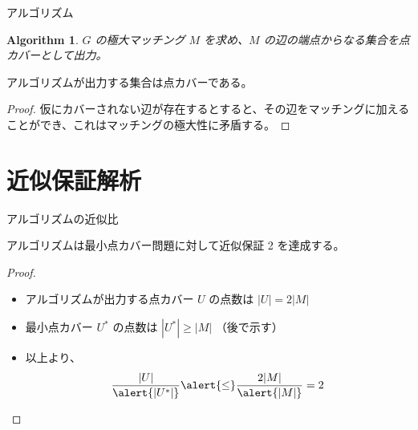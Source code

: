 \documentclass[aspectratio=169]{beamer}
\newtheorem*{algorithm}{Algorithm}
\begin{document}
\begin{frame}{アルゴリズム}
	\begin{algorithm}
		\(G\) の極大マッチング \(M\) を求め、\(M\) の辺の端点からなる集合を点カバーとして出力。
	\end{algorithm}

	\begin{lemma}
		アルゴリズムが出力する集合は点カバーである。
	\end{lemma}

	\begin{proof}
		仮にカバーされない辺が存在するとすると、その辺をマッチングに加えることができ、これはマッチングの極大性に矛盾する。
	\end{proof}
\end{frame}

\section{近似保証解析}

\begin{frame}{アルゴリズムの近似比}
	\begin{theorem}[アルゴリズムの近似比]
		アルゴリズムは最小点カバー問題に対して近似保証 2 を達成する。
	\end{theorem}

	\begin{proof}
		\begin{itemize}
			\item アルゴリズムが出力する点カバー \(U\) の点数は \(|U| = 2|M|\)
			\item 最小点カバー \(U^*\) の点数は \alert{\(|U^*| \ge |M|\)} （後で示す）
			\item 以上より、\[\frac{|U|}{\alert{|U^*|}} \alert{\le} \frac{2|M|}{\alert{|M|}} = 2\]
		\end{itemize}
	\end{proof}
\end{frame}
\end{document}
